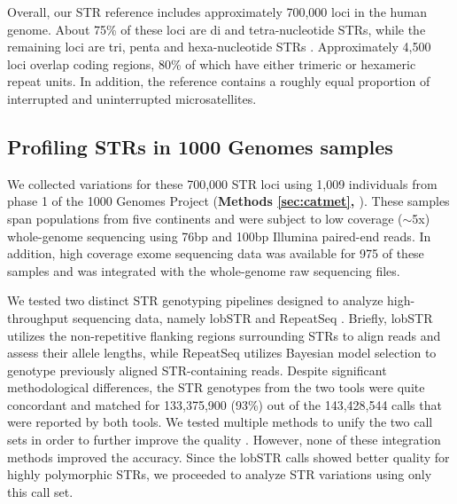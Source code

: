 Overall, our STR reference includes approximately 700,000 loci in the human genome. About 75\% of these loci are di and tetra-nucleotide STRs, while the remaining loci are tri, penta and hexa-nucleotide STRs \cite{SuppWillemsGymrekHighnamEtAl2014}. Approximately 4,500 loci overlap coding regions, 80\% of which have either trimeric or hexameric repeat units.  In addition, the reference contains a roughly equal proportion of interrupted and uninterrupted microsatellites.  

\subsection{Profiling STRs in 1000 Genomes samples}
We collected variations for these 700,000 STR loci using 1,009 individuals from phase 1 of the 1000 Genomes Project (\textbf{Methods \ref{sec:catmet}, \cite{SuppWillemsGymrekHighnamEtAl2014}}). These samples span populations from five continents and were subject to low coverage ($\sim$5x) whole-genome sequencing using 76bp and 100bp Illumina paired-end reads. In addition, high coverage exome sequencing data was available for 975 of these samples and was integrated with the whole-genome raw sequencing files.  

We tested two distinct STR genotyping pipelines designed to analyze high-throughput sequencing data, namely lobSTR \cite{GymrekGolanRossetEtAl2012} and RepeatSeq \cite{HighnamFranckMartinEtAl2013}. Briefly, lobSTR utilizes the non-repetitive flanking regions surrounding STRs to align reads and assess their allele lengths, while RepeatSeq utilizes Bayesian model selection to genotype previously aligned STR-containing reads. Despite significant methodological differences, the STR genotypes from the two tools were quite concordant and matched for 133,375,900 (93\%) out of the 143,428,544 calls that were reported by both tools. We tested multiple methods to unify the two call sets in order to further improve the quality \cite{SuppWillemsGymrekHighnamEtAl2014}. However, none of these integration methods improved the accuracy. Since the lobSTR calls showed better quality for highly polymorphic STRs, we proceeded to analyze STR variations using only this call set.  

